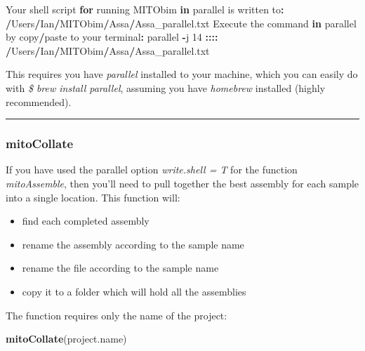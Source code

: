 \documentclass[
]{article}
\newenvironment{Shaded}{\begin{snugshade}}{\end{snugshade}}
\newcommand{\ControlFlowTok}[1]{\textcolor[rgb]{0.13,0.29,0.53}{\textbf{#1}}}
\newcommand{\DecValTok}[1]{\textcolor[rgb]{0.00,0.00,0.81}{#1}}
\newcommand{\ErrorTok}[1]{\textcolor[rgb]{0.64,0.00,0.00}{\textbf{#1}}}
\newcommand{\KeywordTok}[1]{\textcolor[rgb]{0.13,0.29,0.53}{\textbf{#1}}}
\newcommand{\NormalTok}[1]{#1}
\newcommand{\OperatorTok}[1]{\textcolor[rgb]{0.81,0.36,0.00}{\textbf{#1}}}
\newcommand{\StringTok}[1]{\textcolor[rgb]{0.31,0.60,0.02}{#1}}
\providecommand{\tightlist}{%
  \setlength{\itemsep}{0pt}\setlength{\parskip}{0pt}}
\begin{document}
\begin{Shaded}
\begin{Highlighting}[]
\NormalTok{Your shell script }\ControlFlowTok{for}\NormalTok{ running MITObim }\ControlFlowTok{in}\NormalTok{ parallel is written to}\OperatorTok{:}
\ErrorTok{/}\NormalTok{Users}\OperatorTok{/}\NormalTok{Ian}\OperatorTok{/}\NormalTok{MITObim}\OperatorTok{/}\NormalTok{Assa}\OperatorTok{/}\NormalTok{Assa_parallel.txt}
\NormalTok{Execute the command }\ControlFlowTok{in}\NormalTok{ parallel by copy}\OperatorTok{/}\NormalTok{paste to your terminal}\OperatorTok{:}
\NormalTok{parallel }\OperatorTok{-}\NormalTok{j }\DecValTok{14} \OperatorTok{:::}\ErrorTok{:}\StringTok{ }\ErrorTok{/}\NormalTok{Users}\OperatorTok{/}\NormalTok{Ian}\OperatorTok{/}\NormalTok{MITObim}\OperatorTok{/}\NormalTok{Assa}\OperatorTok{/}\NormalTok{Assa_parallel.txt}
\end{Highlighting}
\end{Shaded}

This requires you have \emph{parallel} installed to your machine, which
you can easily do with \emph{\$ brew install parallel}, assuming you
have \emph{homebrew} installed (highly recommended).

\begin{center}\rule{0.5\linewidth}{0.5pt}\end{center}

\hypertarget{mitocollate}{%
\subsubsection{mitoCollate}\label{mitocollate}}

If you have used the parallel option \emph{write.shell = T} for the
function \emph{mitoAssemble}, then you'll need to pull together the best
assembly for each sample into a single location. This function will:

\begin{itemize}
\tightlist
\item
  find each completed assembly
\item
  rename the assembly according to the sample name
\item
  rename the file according to the sample name
\item
  copy it to a folder which will hold all the assemblies
\end{itemize}

The function requires only the name of the project:

\begin{Shaded}
\begin{Highlighting}[]
\KeywordTok{mitoCollate}\NormalTok{(project.name)}
\end{Highlighting}
\end{Shaded}
\end{document}
